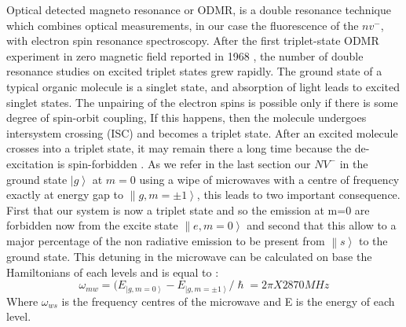 Optical detected magneto resonance or ODMR, is  a  double  resonance  technique  which  combines  optical
measurements, in our case the fluorescence of the $nv^{-}$, with  electron  spin  resonance  spectroscopy.  After  the  first
triplet-state ODMR experiment in zero magnetic field reported  in 1968 \cite{schmidt_optical_1967}, the  number  of double resonance studies on excited triplet states grew rapidly.  The ground state of a typical organic molecule is a
singlet state, and absorption of light leads to excited singlet states. The unpairing of the electron spins is possible only if
there is some degree of spin-orbit coupling, If this happens, then the molecule undergoes intersystem crossing (ISC)  and  becomes  a  triplet  state. After an excited molecule crosses into a triplet state, it may remain there a long time because the de-excitation is
spin-forbidden \cite{carbonera_optically_2009}.
As we refer in the last section our $NV^{-}$ in the ground state $\left| g \right\rangle $ at $m=0$ using a wipe of microwaves with a centre of frequency exactly at energy gap to $\left\| g,m=\pm1\right\rangle $, this leads to two important consequence. First that our system is now a triplet state and so the emission at m=0 are forbidden now from the excite state $\left\| e,m=0\right\rangle $ and second that this allow to a major percentage of the non radiative emission to be present from $\left\| s\right\rangle $ to the ground state. This detuning in the microwave can be calculated on base the Hamiltonians of each levels and is equal to \cite{schirhagl_nitrogen-vacancy_2014}:\\
\begin{equation}
\omega_{mw}=(E_{\left|g,m=0\right\rangle}-E_{\left|g,m=\pm 1\right\rangle}/ \hslash = 2π X 2870MHz 
\end{equation}
Where $\omega_{ws}$ is the frequency centres of the microwave and E is the energy of each level.

